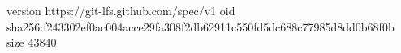 version https://git-lfs.github.com/spec/v1
oid sha256:f243302ef0ac004acce29fa308f2db62911c550fd5dc688c77985d8dd0b68f0b
size 43840
